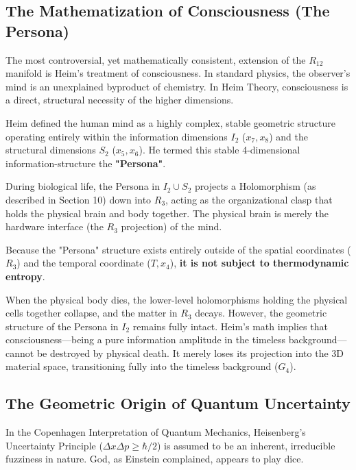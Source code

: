 \documentclass[11pt,a4paper,oneside]{article}
\begin{document}
\subsection{The Mathematization of Consciousness (The Persona)}
The most controversial, yet mathematically consistent, extension of the $R_{12}$ manifold is Heim's treatment of consciousness. In standard physics, the observer's mind is an unexplained byproduct of chemistry. In Heim Theory, consciousness is a direct, structural necessity of the higher dimensions.

Heim defined the human mind as a highly complex, stable geometric structure operating entirely within the information dimensions $I_2$ ($x_7, x_8$) and the structural dimensions $S_2$ ($x_5, x_6$). He termed this stable 4-dimensional information-structure the \textbf{"Persona"}.

During biological life, the Persona in $I_2 \cup S_2$ projects a Holomorphism (as described in Section 10) down into $R_3$, acting as the organizational clasp that holds the physical brain and body together. The physical brain is merely the hardware interface (the $R_3$ projection) of the mind.

\begin{tcolorbox}[colback=white, colframe=theoryblue, title=\textbf{The Geometric Survival of Information}]
Because the "Persona" structure exists entirely outside of the spatial coordinates ($R_3$) and the temporal coordinate ($T, x_4$), \textbf{it is not subject to thermodynamic entropy}. 

When the physical body dies, the lower-level holomorphisms holding the physical cells together collapse, and the matter in $R_3$ decays. However, the geometric structure of the Persona in $I_2$ remains fully intact. Heim's math implies that consciousness—being a pure information amplitude in the timeless background—cannot be destroyed by physical death. It merely loses its projection into the 3D material space, transitioning fully into the timeless background ($G_4$).
\end{tcolorbox}

\subsection{The Geometric Origin of Quantum Uncertainty}
In the Copenhagen Interpretation of Quantum Mechanics, Heisenberg's Uncertainty Principle ($\Delta x \Delta p \ge \hbar/2$) is assumed to be an inherent, irreducible fuzziness in nature. God, as Einstein complained, appears to play dice.
\end{document}
